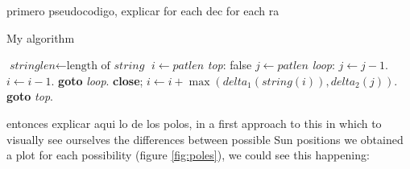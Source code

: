 primero pseudocodigo, explicar for each dec for each ra


\begin{algorithm}
	\caption{My algorithm}\label{euclid}
	\begin{algorithmic}[1]
		\State $\textit{stringlen} \gets \text{length of }\textit{string}$
		\State $i \gets \textit{patlen}$
		\BState \emph{top}:
		 \Return false
		\EndIf
		\State $j \gets \textit{patlen}$
		\BState \emph{loop}:
		\State $j \gets j-1$.
		\State $i \gets i-1$.
		\State \textbf{goto} \emph{loop}.
		\State \textbf{close};
		\EndIf
		\State $i \gets i+\max(\textit{delta}_1(\textit{string}(i)),\textit{delta}_2(j))$.
		\State \textbf{goto} \emph{top}.
		\EndProcedure
	\end{algorithmic}
\end{algorithm}

entonces explicar aqui lo de los polos, in a first approach to this in which to visually see ourselves the differences between possible Sun positions we obtained a plot for each possibility (figure \ref{fig:poles}), we could see this happening:

